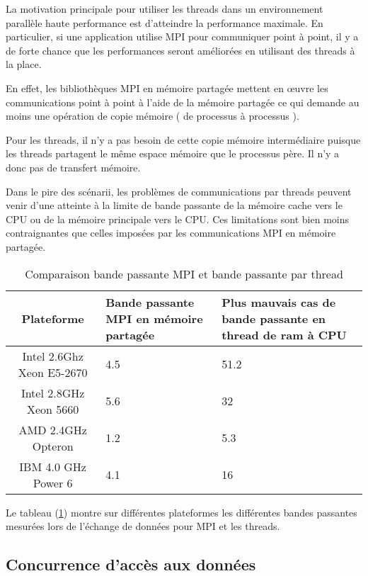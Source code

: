 \documentclass[fleqn,11pt]{article}
\begin{document}
La motivation principale pour utiliser les threads dans un environnement parallèle haute performance est d'atteindre la performance maximale. En particulier, si une application utilise MPI pour communiquer point à point, il y a de forte chance que les performances seront améliorées en utilisant des threads à la place.

En effet, les bibliothèques MPI en mémoire partagée mettent en {\oe}uvre les communications point à point à l'aide de la mémoire partagée ce qui demande au moins une opération de copie mémoire ( de processus à processus ).

Pour les threads, il n'y a pas besoin de cette copie mémoire intermédiaire puisque les threads partagent le même espace mémoire que le processus père. Il n'y a donc pas de transfert mémoire.

Dans le pire des scénarii, les problèmes de communications par threads peuvent venir d'une atteinte à la limite
de bande passante de la mémoire cache vers le CPU ou de la mémoire principale vers le CPU. Ces limitations sont bien moins contraignantes que celles imposées par les communications MPI en mémoire partagée.

\begin{table}[h]
 \begin{center}
  \begin{tabular}{|c|p{4cm}|p{4cm}|}\hline
   \rowcolor{lightgray!50} Plateforme & Bande passante MPI en mémoire partagée & Plus mauvais cas de bande passante en thread de ram à CPU \\ \hline
  Intel 2.6Ghz Xeon E5-2670 & 4.5 & 51.2 \\ \hline
  \rowcolor{lightgray!25}Intel 2.8GHz Xeon 5660 & 5.6 & 32 \\ \hline
  AMD   2.4GHz Opteron & 1.2 & 5.3 \\ \hline
 \rowcolor{lightgray!25}IBM 4.0 GHz Power 6 & 4.1 & 16 \\ \hline
  \end{tabular}
 \end{center}
  \caption{Comparaison bande passante MPI et bande passante par thread}
  \label{tab::compMPIpt}
\end{table}


Le tableau (\ref{tab::compMPIpt}) 
montre sur différentes plateformes les différentes bandes passantes mesurées lors de l'échange de données pour MPI et les threads.

\subsection{Concurrence d'accès aux données}
\end{document}
